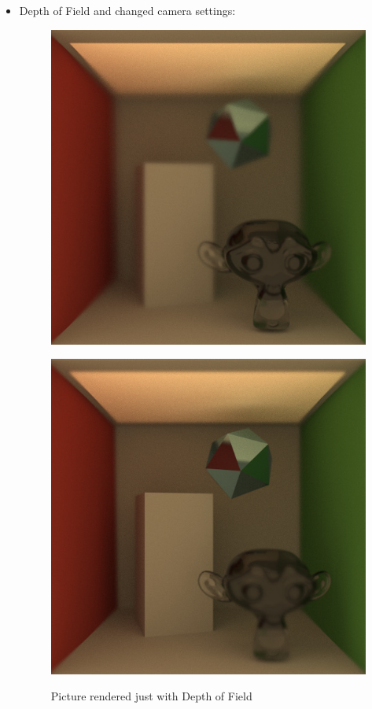 \documentclass[11pt,a4paper]{article}
\begin{document}
\begin{itemize}
\item
Depth of Field and changed camera settings:\\
\begin{figure}[H]
\begin{center}
\begin{minipage}[b]{7.5 cm}
\includegraphics[scale=0.4]{images/DepthOfFieldFront1096spp}
\label{fig:3}
\end{minipage}
\begin{minipage}[b]{7.5 cm}
\includegraphics[scale=0.4]{images/DepthOfFieldBack1000spp}
\label{fig:4}
\end{minipage}
\caption[Picture showing Depth of Field]{Picture rendered just with Depth of Field}
\end{center}
\end{figure}


\end{itemize}
\end{document}
